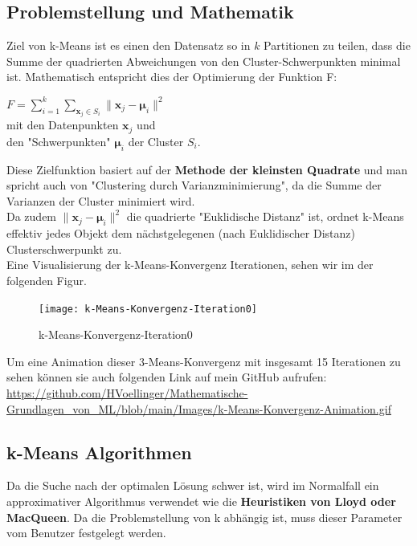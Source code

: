 \documentclass[12pt]{article}
\begin{document}
\subsection{Problemstellung und Mathematik}

Ziel von k-Means ist es einen den Datensatz so in $k$ Partitionen zu teilen, dass die Summe der quadrierten Abweichungen von den Cluster-Schwerpunkten minimal ist. Mathematisch entspricht dies der Optimierung der Funktion F:\\
\begin{center}
$ F = \sum_{i=1}^{k}  \sum_{\mathbf x_j \in S_{i}} {\| \mathbf x_j - \boldsymbol \mu_i \|^2}$ \\[0.2cm]
mit den Datenpunkten $ \mathbf x_j $ und \\
den "Schwerpunkten" $ \boldsymbol \mu_i $ der Cluster $ S_i $.\\[0.2cm]
\end{center}
%
Diese Zielfunktion basiert auf der \textbf{Methode der kleinsten Quadrate} und man spricht auch von "Clustering durch Varianzminimierung", da die Summe der Varianzen der Cluster minimiert wird.\\[0.2cm]
Da zudem $ \| \mathbf x_j - \boldsymbol \mu_i \|^2 $ die quadrierte "Euklidische Distanz" ist, ordnet k-Means effektiv jedes Objekt dem nächstgelegenen (nach Euklidischer Distanz) Clusterschwerpunkt zu.\\ 
Eine Visualisierung der k-Means-Konvergenz Iterationen, sehen wir im der folgenden Figur.
\newpage
%
\begin{figure}[htp]
  \centering
  \hspace*{-0.1cm} 
  \texttt{[image: k-Means-Konvergenz-Iteration0]}
  \caption{k-Means-Konvergenz-Iteration0}
  \label{fig:k-Means-Iteration0}
\end{figure}
%
Um eine Animation dieser 3-Means-Konvergenz mit insgesamt 15 Iterationen zu sehen können sie auch folgenden Link auf mein GitHub aufrufen:\\
\url{https://github.com/HVoellinger/Mathematische-Grundlagen_von_ML/blob/main/Images/k-Means-Konvergenz-Animation.gif}\\

\subsection{k-Means Algorithmen}

Da die Suche nach der optimalen Lösung schwer ist, wird im Normalfall ein approximativer Algorithmus verwendet wie die \textbf{ Heuristiken von Lloyd oder MacQueen}. Da die Problemstellung von k abhängig ist, muss dieser Parameter vom Benutzer festgelegt werden.\\
\end{document}
